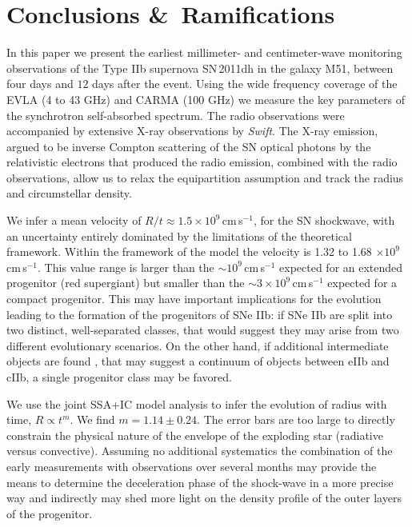 \documentclass{emulateapj}
\begin{document}
\section{Conclusions \&\ Ramifications}
\label{sec:Conclusions}

In this paper we present the earliest millimeter- and centimeter-wave monitoring
observations of the Type IIb supernova SN\,2011dh in the galaxy M51,  
between four days and $12$ days after the event. Using the wide
frequency coverage of the EVLA 
(4 to 43 GHz) and CARMA (100 GHz) we measure the key parameters
of the synchrotron self-absorbed spectrum. The radio observations were accompanied
by extensive X-ray observations by {\it Swift}. The 
X-ray emission, argued to be inverse Compton scattering of the SN optical
photons by the relativistic electrons that produced the radio emission, 
 combined with the radio observations,  allow us to relax the equipartition
assumption and track the radius and circumstellar density.


We infer a mean velocity of $R/t \approx 1.5\times
10^9\,$cm\,s$^{-1}$, for the SN shockwave, with an uncertainty entirely dominated by the limitations
of the theoretical framework. Within the framework of the model the velocity is
1.32 to 1.68 $\times 10^9\,$cm\,s$^{-1}$.  This value range is  larger
than the $\sim 10^9\,$cm\,s$^{-1}$
expected for an extended progenitor (red supergiant) but smaller than
the $\sim 3\times 10^9\,$cm\,s$^{-1}$ 
expected for a compact progenitor. 
This may have important implications for the evolution leading to the formation of the progenitors
of SNe IIb: if SNe IIb are split into two distinct, well-separated classes, that would suggest they may
arise from two different evolutionary scenarios. On the other hand, if additional intermediate objects are found
, that may suggest a continuum of objects between eIIb and cIIb, a single
progenitor class may be favored.


We use the joint SSA+IC model analysis to infer the evolution of radius
with time, $R\propto t^m$. We find $m=1.14\pm 0.24$.  The error bars are
too large to directly constrain the physical nature of the envelope of the exploding
star (radiative versus convective).  Assuming no additional systematics the 
combination
of the early measurements with observations over several  
months may provide the means to determine the deceleration
phase of the shock-wave in a more precise way and indirectly may shed more light
on the density profile of the outer layers of the progenitor. 
\end{document}
